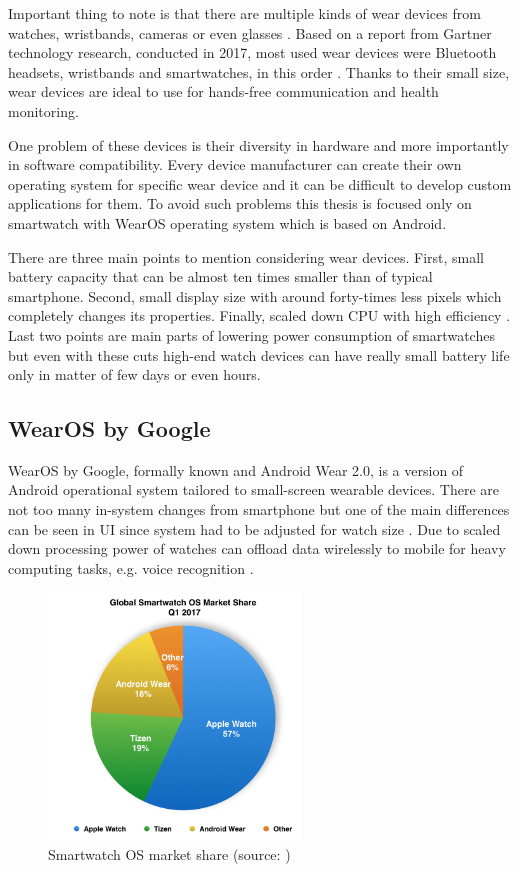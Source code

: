 Important thing to note is that there are multiple kinds of wear devices from watches, wristbands, cameras or even glasses \cite{MIWD}. Based on a report from Gartner technology research, conducted in 2017, most used wear devices were Bluetooth headsets, wristbands and smartwatches, in this order \cite{GSWWDS}. Thanks to their small size, wear devices are ideal to use for hands-free communication and health monitoring.

One problem of these devices is their diversity in hardware and more importantly in software compatibility. Every device manufacturer can create their own operating system for specific wear device and it can be difficult to develop custom applications for them. To avoid such problems this thesis is focused only on smartwatch with WearOS operating system which is based on Android. 

There are three main points to mention considering wear devices. First, small battery capacity that can be almost ten times smaller than of typical smartphone. Second, small display size with around forty-times less pixels which completely changes its properties. Finally, scaled down CPU with high efficiency \cite{UtCoAWO}. Last two points are main parts of lowering power consumption of smartwatches but even with these cuts high-end watch devices can have really small battery life only in matter of few days or even hours.

\subsection{WearOS by Google}\label{sec:WearOS}
WearOS by Google, formally known and Android Wear 2.0, is a version of Android operational system tailored to small-screen wearable devices. There are not too many in-system changes from smartphone but one of the main differences can be seen in UI since system had to be adjusted for watch size \cite{CSUITW}. Due to scaled down processing power of watches can offload data wirelessly to mobile for heavy computing tasks, e.g. voice recognition \cite{UCAW}.

\begin{figure}[H]
	\begin{centering}
		\includegraphics[width=0.6\textwidth]{img/wear_market_share}
		\par\end{centering}
	\caption{Smartwatch OS market share (source: \cite{TOAW})\label{fig:SmartwatchOSMarketShare}}
	\label{fig02c04}
\end{figure}

